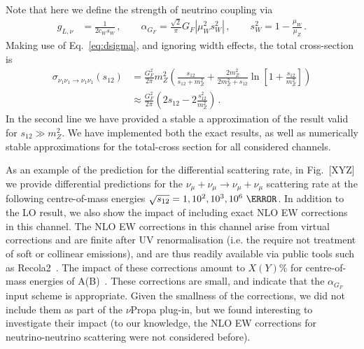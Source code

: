 \documentclass[a4paper,11pt]{article}
\begin{document}
%
Note that here we define the strength of neutrino coupling via
%
\begin{align}
g_{L,\nu} &=  \frac{1}{2 c_W s_W}\,, \qquad 
\alpha_{G_F} = \frac{\sqrt{2}}{\pi} G_{F} | \mu_W^2 s_W^2|\,,
\qquad
s_W^2 = 1 - \frac{\mu_W}{\mu_Z}\,.
\end{align}
%
Making use of Eq.~\eqref{eq:dsigma}, and ignoring width effects, the total cross-section is
\begin{align} \nonumber
\sigma_{\nu_1 \nu_1\to \nu_1 \nu_1}(s_{12}) &= \frac{G_F^2}{2\pi} m_Z^2 
	\left(  \frac{s_{12}}{ s_{12} + m_Z^2} + \frac{ 2 m_Z^2 }{ 2 m_Z^2 + s_{12} } \ln\left[ 1 + \frac{ s_{12} }{ m_Z^2} \right] \right) \\
								&\approx \frac{G_F^2}{2\pi} \left(2 s_{12} - 2 \frac{s_{12}^2}{m_Z^2} \right)\,.
\end{align}
%
In the second line we have provided a stable a approximation of the result valid for $s_{12} \gg m_Z^2$.
We have implemented both the exact results, as well as numerically stable approximations for the total-cross section for all considered channels.

As an example of the prediction for the differential scattering rate, in Fig.~[XYZ] we provide differential predictions for the $\nu_\mu + \nu_\mu \to \nu_\mu + \nu_\mu$ scattering rate at the following centre-of-mass energies $\sqrt{s_{12}} = 1, 10^2, 10^3,10^6~\GeV$. 
%
In addition to the LO result, we also show the impact of including exact NLO EW corrections in this channel. 
The NLO EW corrections in this channel arise from virtual corrections and are finite after UV renormalisation (i.e. the require not treatment of soft or collinear emissions), and are thus readily available via public tools such as Recola2~\cite{Denner:2017wsf}.
%
The impact of these corrections amount to $X(Y)\%$ for centre-of-mass energies of A(B)~\GeV.
These corrections are small, and indicate that the $\alpha_{G_F}$ input scheme is appropriate. 
Given the smallness of the corrections, we did not include them as part of the $\nu$Propa plug-in, but we found interesting to investigate their impact (to our knowledge, the NLO EW corrections for neutrino-neutrino scattering were not considered before).

\end{document}
